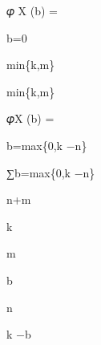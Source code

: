 \documentclass[a4paper,portrait,12pt]{article}
\begin{document}
\begin{flushleft}
𝜑 X (b) =
\end{flushleft}


\begin{flushleft}
b=0
\end{flushleft}





\begin{flushleft}
min\{k,m\}
\end{flushleft}





\begin{flushleft}
min\{k,m\}
\end{flushleft}





\begin{flushleft}
𝜑X (b) =
\end{flushleft}


\begin{flushleft}
b=max\{0,k $-$n\}
\end{flushleft}





\begin{flushleft}
∑b=max\{0,k $-$n\}
\end{flushleft}


\begin{flushleft}
n+m
\end{flushleft}


\begin{flushleft}
k
\end{flushleft}





\begin{flushleft}
m
\end{flushleft}


\begin{flushleft}
b
\end{flushleft}





\begin{flushleft}
n
\end{flushleft}


\begin{flushleft}
k $-$b
\end{flushleft}
\end{document}
